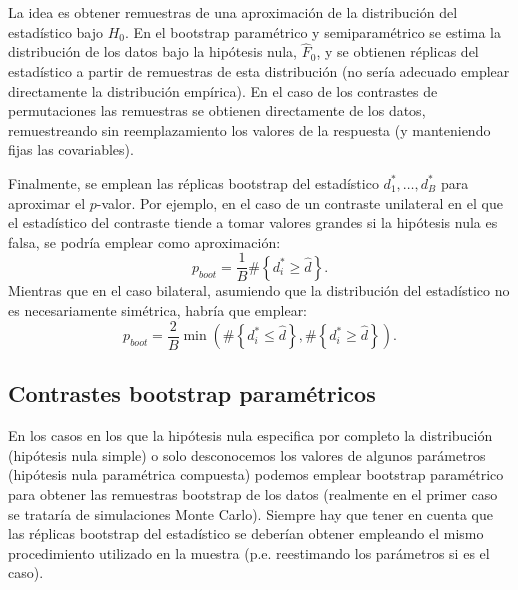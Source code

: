 \documentclass[
]{book}
\theoremstyle{break}
\theoremstyle{nonumberplain}
\begin{document}
La idea es obtener remuestras de una aproximación de la distribución del
estadístico bajo \(H_0\).
En el bootstrap paramétrico y semiparamétrico se estima la distribución
de los datos bajo la hipótesis nula, \(\hat{F}_0\), y se obtienen réplicas del
estadístico a partir de remuestras de esta distribución (no sería adecuado
emplear directamente la distribución empírica).
En el caso de los contrastes de permutaciones las remuestras se obtienen
directamente de los datos, remuestreando sin reemplazamiento los valores
de la respuesta (y manteniendo fijas las covariables).

Finalmente, se emplean las réplicas bootstrap
del estadístico \(d_1^{\ast},\ldots, d_B^{\ast}\) para aproximar el \(p\)-valor.
Por ejemplo, en el caso de un contraste unilateral en el que el estadístico del
contraste tiende a tomar valores grandes si la hipótesis nula es falsa,
se podría emplear como aproximación:
\[p_{boot} = \frac{1}{B}\#\left\{ d_i^{\ast} \geq \hat{d} \right\}.\]
Mientras que en el caso bilateral, asumiendo que la distribución del estadístico
no es necesariamente simétrica, habría que emplear:
\[p_{boot} = \frac{2}{B} \min \left(\#\left\{ d_i^{\ast} \leq \hat{d} \right\},
\#\left\{ d_i^{\ast} \geq \hat{d} \right\}\right).\]

\hypertarget{contrastes-parametricos}{%
\subsection{Contrastes bootstrap paramétricos}\label{contrastes-parametricos}}

En los casos en los que la hipótesis nula especifica por completo la distribución
(hipótesis nula simple) o solo desconocemos los valores de algunos parámetros
(hipótesis nula paramétrica compuesta) podemos emplear
bootstrap paramétrico para obtener las remuestras bootstrap de los datos
(realmente en el primer caso se trataría de simulaciones Monte Carlo).
Siempre hay que tener en cuenta que las réplicas bootstrap del estadístico se
deberían obtener empleando el mismo procedimiento utilizado en la muestra
(p.e. reestimando los parámetros si es el caso).
\end{document}
